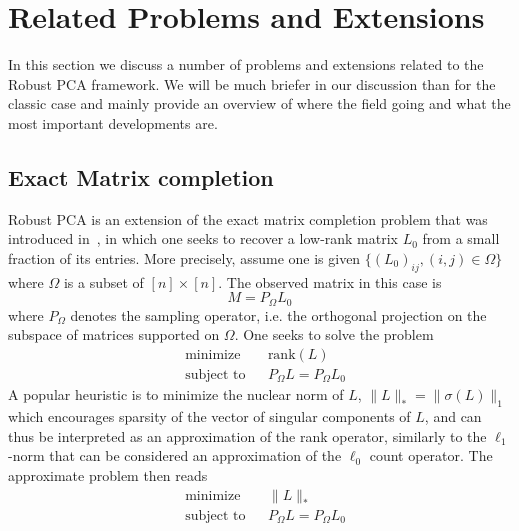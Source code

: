 
\section{Related Problems and Extensions}

In this section we discuss a number of problems and extensions related to the Robust PCA framework. We will be much briefer in our discussion than for the classic case and mainly provide an overview of where the field going and what the most important developments are.



\subsection{Exact Matrix completion}
Robust PCA is an extension of the exact matrix completion problem that was introduced in~\cite{Candes:2009uq}, in which one seeks to recover a low-rank matrix $L_0$ from a small fraction of its entries. More precisely, assume one is given $\{(L_0)_{ij}, (i,j)\in \Omega\}$ where $\Omega$ is a subset of $[n]\times [n]$. The observed matrix in this case is
\[
M = P_\Omega L_0
\]
where $P_\Omega$ denotes the sampling operator, i.e. the orthogonal projection on the subspace of matrices supported on $\Omega$. One seeks to solve the problem
%
\begin{equation}
\begin{aligned}
&\text{minimize} && \text{rank}(L) \\
&\text{subject to} && P_\Omega L = P_\Omega L_0
\end{aligned}
\label{theory:Related:ExactMatComp:exact}
\end{equation}
%
A popular heuristic is to minimize the nuclear norm of $L$, $\|L\|_* = \|\sigma(L)\|_1$ which encourages sparsity of the vector of singular components of $L$, and can thus be interpreted as an approximation of the rank operator, similarly to the $\ell_1$-norm that can be considered an approximation of the $\ell_0$ count operator. The approximate problem then reads
%
\begin{equation}
\begin{aligned}
&\text{minimize} && \|L\|_* \\
&\text{subject to} && P_\Omega L = P_\Omega L_0
\end{aligned}
\label{theory:Related:ExactMatComp:heuristic}
\end{equation}


